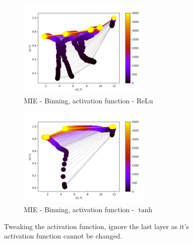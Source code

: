 \documentclass[dissertation.tex]{subfiles}
\begin{document}
\begin{figure}[ht]
  \centering
  \begin{subfigure}[t]{0.49\textwidth}
    \centering
    \includegraphics[width=0.7\textwidth]{figs/eval/activationFunction/BinningRelu.png}
    \caption{
      MIE - Binning, activation function - ReLu
    }
    \label{figReluTanhRelu}
  \end{subfigure}
  \begin{subfigure}[t]{0.49\textwidth}
    \centering
    \includegraphics[width=0.7\textwidth]{figs/eval/activationFunction/BinningTanh.png}
    \caption{
      MIE - Binning, activation function - $\tanh$
    }
    \label{figReluTanhTanh}
  \end{subfigure}
  \caption{
      Tweaking the activation function, ignore the last layer as it's
      activation function cannot be changed.
    }
  \label{figReluTanh}
\end{figure}
\end{document}
